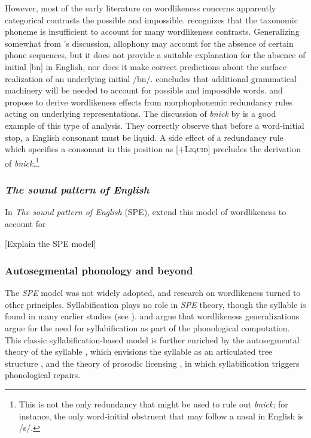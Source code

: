 However, most of the early literature on wordlikeness concerns apparently categorical contrasts the possible and impossible. \citet[][31]{Vogt1954} recognizes that the taxonomic phoneme is insufficient to account for many wordlikeness contrasts. Generalizing somewhat from \citeauthor{Vogt1954}'s discussion, allophony may account for the absence of certain phone sequences, but it does not provide a suitable explanation for the absence of initial [bn] in English, nor does it make correct predictions about the surface realization of an underlying initial /bn/. \citeauthor{Vogt1954} concludes that additional grammatical machinery will be needed to account for possible and impossible words. \citet{Halle1962} and \citet{Stanley1967} propose to derive wordlikeness effects from morphophonemic redundancy rules acting on underlying representations. The discussion of \emph{bnick} by \citet[][101]{Chomsky1965} is a good example of this type of analysis. They correctly observe that before a word-initial stop, a English consonant must be liquid. A side effect of a redundancy rule which specifies a consonant in this position as [$+$\textsc{Liquid}] precludes the derivation of \emph{bnick}.\footnote{This is not the only redundancy that might be used to rule out \emph{bnick}; for instance, the only word-initial obstruent that may follow a nasal in English is /s/.}

\subsubsection{\emph{The sound pattern of English}}

In \emph{The sound pattern of English} (SPE), \citet{SPE} extend this model of wordlikeness to account for 

[Explain the SPE model]

\subsubsection{Autosegmental phonology and beyond}

The \emph{SPE} model was not widely adopted, and research on wordlikeness turned to other principles. Syllabification plays no role in \emph{SPE} theory, though the syllable is found in many earlier studies (see \citealp{Goldsmith2011b}). \citet{Hooper1973} and \citet{Kahn1976} argue that wordlikeness generalizations argue for the need for syllabification as part of the phonological computation. This classic syllabification-based model is further enriched by the autosegmental theory of the syllable \citep{McCarthy1979b}, which envisions the syllable as an articulated tree structure \citep[as envisioned by][]{Pike1947a}, and the theory of prosodic licensing \citep{Ito1989a}, in which syllabification triggers phonological repairs.

